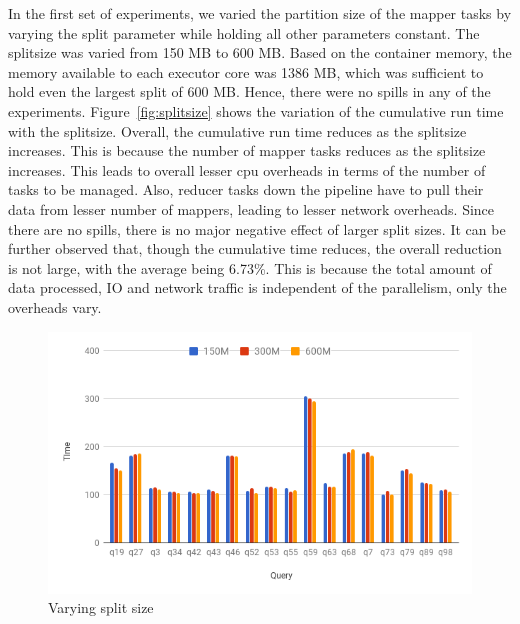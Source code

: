 In the first set of experiments, we varied the partition size of the mapper tasks by varying the split parameter while holding all other parameters constant. The splitsize was varied from 150 MB to 600 MB. Based on the container memory, the memory available to each executor core was 1386 MB, which was sufficient to hold even the largest split of 600 MB. Hence, there were no spills in any of the experiments. Figure~\ref{fig:splitsize} shows the variation of the cumulative run time with the splitsize. Overall, the cumulative run time reduces as the splitsize increases. This is because the number of mapper tasks reduces as the splitsize increases. This leads to overall lesser cpu overheads in terms of the number of tasks to be managed. Also, reducer tasks down the pipeline have to pull their data from lesser number of mappers, leading to lesser network overheads. Since there are no spills, there is no major negative effect of larger split sizes. It can be further observed that, though the cumulative time reduces, the overall reduction is not large, with the average being 6.73\%. This is because the total amount of data processed, IO and network traffic is independent of the parallelism, only the overheads vary. 

\begin{figure}[h]
	\includegraphics[width=\linewidth]{fig/varysplitsize.png}
	\caption{Varying split size}
	\label{fig:varysplitsize}
\end{figure}



